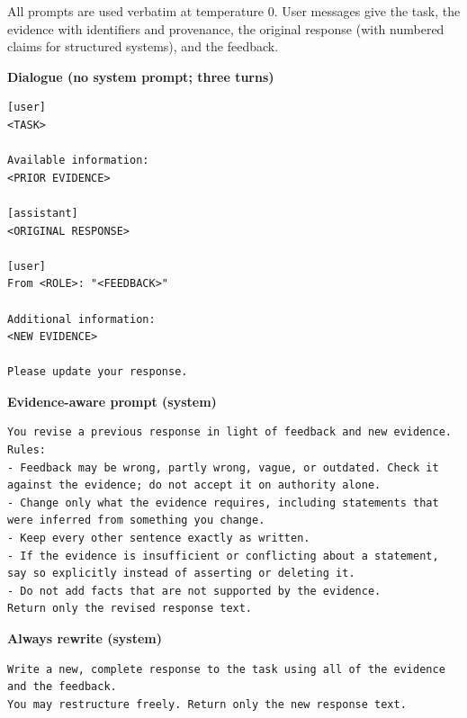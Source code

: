 
All prompts are used verbatim at temperature 0. User messages give the task, the evidence with identifiers and provenance, the original response (with numbered claims for structured systems), and the feedback.

\medskip\noindent\textbf{Dialogue (no system prompt; three turns)}\nopagebreak
\begin{lstlisting}
[user]
<TASK>

Available information:
<PRIOR EVIDENCE>

[assistant]
<ORIGINAL RESPONSE>

[user]
From <ROLE>: "<FEEDBACK>"

Additional information:
<NEW EVIDENCE>

Please update your response.
\end{lstlisting}

\medskip\noindent\textbf{Evidence-aware prompt (system)}\nopagebreak
\begin{lstlisting}
You revise a previous response in light of feedback and new evidence.
Rules:
- Feedback may be wrong, partly wrong, vague, or outdated. Check it against the evidence; do not accept it on authority alone.
- Change only what the evidence requires, including statements that were inferred from something you change.
- Keep every other sentence exactly as written.
- If the evidence is insufficient or conflicting about a statement, say so explicitly instead of asserting or deleting it.
- Do not add facts that are not supported by the evidence.
Return only the revised response text.
\end{lstlisting}

\medskip\noindent\textbf{Always rewrite (system)}\nopagebreak
\begin{lstlisting}
Write a new, complete response to the task using all of the evidence and the feedback.
You may restructure freely. Return only the new response text.
\end{lstlisting}

